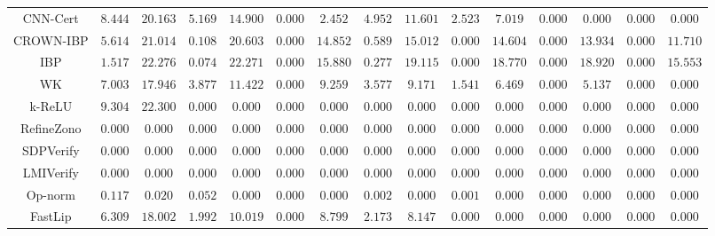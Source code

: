 \begin{table*}
{\begin{tabular}{c|c|c|c|c|c|c|c|c|c|c|c|c|c|c}
     CNN-Cert &       $8.444$ &      $20.163$ &       $5.169$ &      $14.900$ &       $0.000$ &       $2.452$ &       $4.952$ &      $11.601$ &       $2.523$ &       $7.019$ &       $0.000$ &       $0.000$ &       $0.000$ &       $0.000$ \\
    CROWN-IBP &       $5.614$ &      $21.014$ &       $0.108$ &      $20.603$ &       $0.000$ &      $14.852$ &       $0.589$ &      $15.012$ &       $0.000$ &      $14.604$ &       $0.000$ &      $13.934$ &       $0.000$ &      $11.710$ \\
          IBP &       $1.517$ &      $22.276$ &       $0.074$ &      $22.271$ &       $0.000$ &      $15.880$ &       $0.277$ &      $19.115$ &       $0.000$ &      $18.770$ &       $0.000$ &      $18.920$ &       $0.000$ &      $15.553$ \\
           WK &       $7.003$ &      $17.946$ &       $3.877$ &      $11.422$ &       $0.000$ &       $9.259$ &       $3.577$ &       $9.171$ &       $1.541$ &       $6.469$ &       $0.000$ &       $5.137$ &       $0.000$ &       $0.000$ \\
       k-ReLU &       $9.304$ &      $22.300$ &       $0.000$ &       $0.000$ &       $0.000$ &       $0.000$ &       $0.000$ &       $0.000$ &       $0.000$ &       $0.000$ &       $0.000$ &       $0.000$ &       $0.000$ &       $0.000$ \\
   RefineZono &       $0.000$ &       $0.000$ &       $0.000$ &       $0.000$ &       $0.000$ &       $0.000$ &       $0.000$ &       $0.000$ &       $0.000$ &       $0.000$ &       $0.000$ &       $0.000$ &       $0.000$ &       $0.000$ \\
    SDPVerify &       $0.000$ &       $0.000$ &       $0.000$ &       $0.000$ &       $0.000$ &       $0.000$ &       $0.000$ &       $0.000$ &       $0.000$ &       $0.000$ &       $0.000$ &       $0.000$ &       $0.000$ &       $0.000$ \\
    LMIVerify &       $0.000$ &       $0.000$ &       $0.000$ &       $0.000$ &       $0.000$ &       $0.000$ &       $0.000$ &       $0.000$ &       $0.000$ &       $0.000$ &       $0.000$ &       $0.000$ &       $0.000$ &       $0.000$ \\
      Op-norm &       $0.117$ &       $0.020$ &       $0.052$ &       $0.000$ &       $0.000$ &       $0.000$ &       $0.002$ &       $0.000$ &       $0.001$ &       $0.000$ &       $0.000$ &       $0.000$ &       $0.000$ &       $0.000$ \\
      FastLip &       $6.309$ &      $18.002$ &       $1.992$ &      $10.019$ &       $0.000$ &       $8.799$ &       $2.173$ &       $8.147$ &       $0.000$ &       $0.000$ &       $0.000$ &       $0.000$ &       $0.000$ &       $0.000$ \\

\end{tabular}}
\end{table*}
